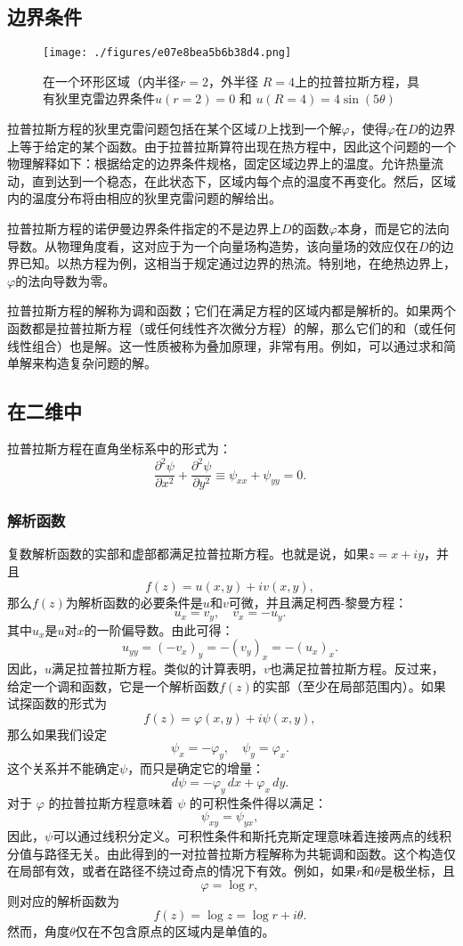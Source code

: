 \subsection{边界条件}
\begin{figure}[ht]
\centering
\texttt{[image: ./figures/e07e8bea5b6b38d4.png]}
\caption{在一个环形区域（内半径\( r = 2 \)，外半径 \( R = 4 \)上的拉普拉斯方程，具有狄里克雷边界条件\( u(r=2) = 0 \) 和 \( u(R=4) = 4 \sin(5 \theta)\)} \label{fig_LPLSFC_1}
\end{figure}
拉普拉斯方程的狄里克雷问题包括在某个区域\( D \)上找到一个解\( \varphi \)，使得\( \varphi \)在\( D \)的边界上等于给定的某个函数。由于拉普拉斯算符出现在热方程中，因此这个问题的一个物理解释如下：根据给定的边界条件规格，固定区域边界上的温度。允许热量流动，直到达到一个稳态，在此状态下，区域内每个点的温度不再变化。然后，区域内的温度分布将由相应的狄里克雷问题的解给出。

拉普拉斯方程的诺伊曼边界条件指定的不是边界上\( D \)的函数\( \varphi \)本身，而是它的法向导数。从物理角度看，这对应于为一个向量场构造势，该向量场的效应仅在\( D \)的边界已知。以热方程为例，这相当于规定通过边界的热流。特别地，在绝热边界上，\( \varphi \)的法向导数为零。

拉普拉斯方程的解称为调和函数；它们在满足方程的区域内都是解析的。如果两个函数都是拉普拉斯方程（或任何线性齐次微分方程）的解，那么它们的和（或任何线性组合）也是解。这一性质被称为叠加原理，非常有用。例如，可以通过求和简单解来构造复杂问题的解。
\subsection{在二维中}  
拉普拉斯方程在直角坐标系中的形式为：
\[
\frac{\partial^2 \psi}{\partial x^2} + \frac{\partial^2 \psi}{\partial y^2} \equiv \psi_{xx} + \psi_{yy} = 0.~
\]
\subsubsection{解析函数}  
复数解析函数的实部和虚部都满足拉普拉斯方程。也就是说，如果\( z = x + iy \)，并且
\[
f(z) = u(x, y) + iv(x, y),~
\]
那么\( f(z) \)为解析函数的必要条件是\( u \)和\( v \)可微，并且满足柯西-黎曼方程：
\[
u_x = v_y, \quad v_x = -u_y.~
\]
其中\( u_x \)是\( u \)对\( x \)的一阶偏导数。由此可得：
\[
u_{yy} = (-v_x)_y = -(v_y)_x = -(u_x)_x.~
\]
因此，\( u \)满足拉普拉斯方程。类似的计算表明，\( v \)也满足拉普拉斯方程。反过来，给定一个调和函数，它是一个解析函数\( f(z) \)的实部（至少在局部范围内）。如果试探函数的形式为
\[
f(z) = \varphi(x, y) + i \psi(x, y),~
\]
那么如果我们设定
\[
\psi_x = -\varphi_y, \quad \psi_y = \varphi_x.~
\]
这个关系并不能确定\( \psi \)，而只是确定它的增量：
\[
d\psi = -\varphi_y\, dx + \varphi_x\, dy.~
\]
对于 \( \varphi \) 的拉普拉斯方程意味着 \( \psi \) 的可积性条件得以满足：
\[
\psi_{xy} = \psi_{yx},~
\]
因此，\( \psi \)可以通过线积分定义。可积性条件和斯托克斯定理意味着连接两点的线积分值与路径无关。由此得到的一对拉普拉斯方程解称为共轭调和函数。这个构造仅在局部有效，或者在路径不绕过奇点的情况下有效。例如，如果\( r \)和\( \theta \)是极坐标，且
\[
\varphi = \log r,~
\]
则对应的解析函数为
\[
f(z) = \log z = \log r + i \theta.~
\]
然而，角度\( \theta \)仅在不包含原点的区域内是单值的。

